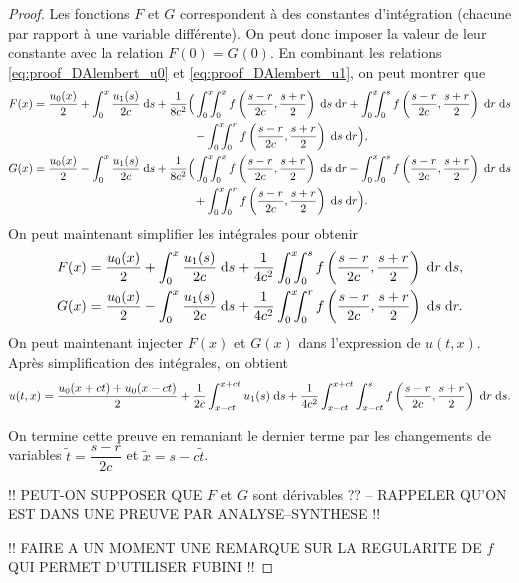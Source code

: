 \documentclass[12pt,a4paper,twoside]{article}
\begin{document}
\begin{proof}
  Les fonctions $F$ et $G$ correspondent \`a des constantes d'int\'egration
  (chacune par rapport \`a une variable diff\'erente).
  On peut donc imposer la valeur de leur constante avec la relation $F(0) = G(0)$.
  En combinant les relations \eqref{eq:proof_DAlembert_u0}
  et \eqref{eq:proof_DAlembert_u1}, on peut montrer que
  \begin{align*}
    F(x) &= \dfrac{u_0(x)}{2} + \int_{0}^{x} \dfrac{u_1(s)}{2c} \deriv s
    + \dfrac{1}{8c^2} \Big(
    \int_0^x \!\!\!\int_0^x f\left(\dfrac{s-r}{2c} , \dfrac{s+r}{2} \right) \deriv s \deriv r
    + \int_0^x \!\!\!\int_0^s f\left(\dfrac{s-r}{2c} , \dfrac{s+r}{2} \right) \deriv r \deriv s
    \\
    & \qquad \qquad \qquad \qquad \qquad \qquad \qquad 
      - \int_0^x \!\!\!\int_0^r f\left(\dfrac{s-r}{2c} , \dfrac{s+r}{2} \right) \deriv s \deriv r
    \Big) ,
    \\
    G(x) &= \dfrac{u_0(x)}{2} - \int_{0}^{x} \dfrac{u_1(s)}{2c} \deriv s
    + \dfrac{1}{8c^2} \Big(
    \int_0^x \!\!\!\int_0^x f\left(\dfrac{s-r}{2c} , \dfrac{s+r}{2} \right) \deriv s \deriv r
    - \int_0^x \!\!\!\int_0^s f\left(\dfrac{s-r}{2c} , \dfrac{s+r}{2} \right) \deriv r \deriv s
    \\
    & \qquad \qquad \qquad \qquad \qquad \qquad \qquad 
      + \int_0^x \!\!\!\int_0^r f\left(\dfrac{s-r}{2c} , \dfrac{s+r}{2} \right) \deriv s \deriv r
    \Big) .
  \end{align*}
  On peut maintenant simplifier les int\'egrales pour obtenir
  \begin{align*}
    F(x) &= \dfrac{u_0(x)}{2} + \int_{0}^{x} \dfrac{u_1(s)}{2c} \;\mathrm{d} s
           + \dfrac{1}{4c^2} 
           \int_0^x \!\!\!\int_0^s f\left(\dfrac{s-r}{2c} , \dfrac{s+r}{2} \right)
           \;\mathrm{d} r \;\mathrm{d} s ,
    \\
    G(x) &= \dfrac{u_0(x)}{2} - \int_{0}^{x} \dfrac{u_1(s)}{2c} \;\mathrm{d} s
           + \dfrac{1}{4c^2}
           \int_0^x \!\!\!\int_0^r f\left(\dfrac{s-r}{2c} , \dfrac{s+r}{2} \right) \;\mathrm{d} s \;\mathrm{d} r .
  \end{align*}
  On peut maintenant injecter $F(x)$ et $G(x)$ dans l'expression de $u(t,x)$.
  Apr\`es simplification des int\'egrales, on obtient
  \begin{align*}
    u(t,x) = \dfrac{u_0(x+ct) + u_0(x-ct)}{2} + \dfrac{1}{2c} \int_{x-ct}^{x+ct} u_1(s) \;\mathrm{d} s
    + \dfrac{1}{4c^2} \int_{x-ct}^{x+ct} \int_{x-ct}^{s} f\left(\dfrac{s-r}{2c} , \dfrac{s+r}{2}\right)
    \;\mathrm{d} r \;\mathrm{d} s .
  \end{align*}

  On termine cette preuve en remaniant le dernier terme par les changements de variables
  $\tilde{t} = \dfrac{s-r}{2c}$ et $\tilde{x} = s - c \tilde{t}$.

  !! PEUT-ON SUPPOSER QUE $F$ et $G$ sont d\'erivables ??
  -- RAPPELER QU'ON EST DANS UNE PREUVE PAR ANALYSE--SYNTHESE !!

  !! FAIRE A UN MOMENT UNE REMARQUE SUR LA REGULARITE DE $f$
  QUI PERMET D'UTILISER FUBINI !!
\end{proof}
\end{document}
